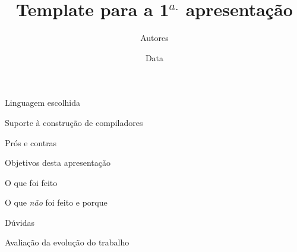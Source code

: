 \documentclass{beamer}
\title[Compiladores 2017.2]{Template para a 1$^{a.}$ apresentação}
\author[Abrev.]{Autores}
\institute[UFF]{Universidade Federal Fluminense}
\date{Data}
\begin{document}

\begin{frame}[plain]

\titlepage

\end{frame}


\begin{frame}{Linguagem escolhida}

\end{frame}


\begin{frame}{Suporte à construção de compiladores}

\end{frame}


\begin{frame}{Prós e contras}

\end{frame}

\begin{frame}{Objetivos desta apresentação}

\end{frame}


\begin{frame}{O que foi feito}

\end{frame}


\begin{frame}{O que \emph{não} foi feito e porque}

\end{frame}


\begin{frame}{Dúvidas}

\end{frame}


\begin{frame}{Avaliação da evolução do trabalho}

\end{frame}
\end{document}
